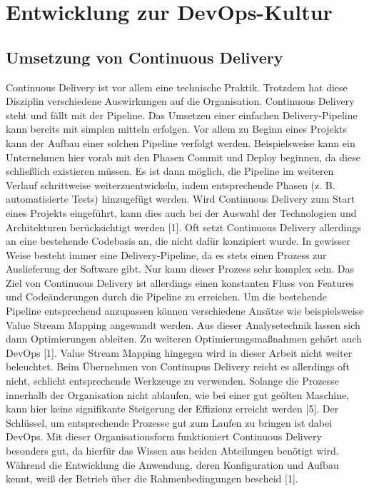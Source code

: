 \section{Entwicklung zur DevOps-Kultur} \label{entwicklung}

\subsection{Umsetzung von Continuous Delivery}
Continuous Delivery ist vor allem eine technische Praktik. Trotzdem hat diese Disziplin verschiedene Auswirkungen auf die Organisation. Continuous Delivery steht und fällt mit der Pipeline. Das Umsetzen einer einfachen Delivery-Pipeline kann bereits mit simplen mitteln erfolgen. Vor allem zu Beginn eines Projekts kann der Aufbau einer solchen Pipeline verfolgt werden. Beispielsweise kann ein Unternehmen hier vorab mit den Phasen Commit und Deploy beginnen, da diese schließlich existieren müssen. Es ist dann möglich, die Pipeline im weiteren Verlauf schrittweise weiterzuentwickeln, indem entsprechende Phasen (z. B. automatisierte Tests) hinzugefügt werden. Wird Continuous Delivery zum Start eines Projekts eingeführt, kann dies auch bei der Auswahl der Technologien und Architekturen berücksichtigt werden [1]. 
Oft setzt Continuous Delivery allerdings an eine bestehende Codebasis an, die nicht dafür konzipiert wurde. In gewisser Weise besteht immer eine Delivery-Pipeline, da es stets einen Prozess zur Auslieferung der Software gibt. Nur kann dieser Prozess sehr komplex sein. Das Ziel von Continuous Delivery ist allerdings einen konstanten Fluss von Features und Codeänderungen durch die Pipeline zu erreichen. Um die bestehende Pipeline entsprechend anzupassen können verschiedene Ansätze wie beispielsweise Value Stream Mapping angewandt werden. Aus dieser Analysetechnik lassen sich dann Optimierungen ableiten. Zu weiteren Optimierungsmaßnahmen gehört auch DevOps [1]. Value Stream Mapping hingegen wird in dieser Arbeit nicht weiter beleuchtet. 
Beim Übernehmen von Continupus Delivery reicht es allerdings oft nicht, schlicht entsprechende Werkzeuge zu verwenden. Solange die Prozesse innerhalb der Organisation nicht ablaufen, wie bei einer gut geölten Maschine, kann hier keine signifikante Steigerung der Effizienz erreicht werden [5]. Der Schlüssel, um entsprechende Prozesse gut zum Laufen zu bringen ist dabei DevOps. Mit dieser Organisationsform funktioniert Continuous Delivery besonders gut, da hierfür das Wissen aus beiden Abteilungen benötigt wird. Während die Entwicklung die Anwendung, deren Konfiguration und Aufbau kennt, weiß der Betrieb über die Rahmenbedingungen bescheid [1].

